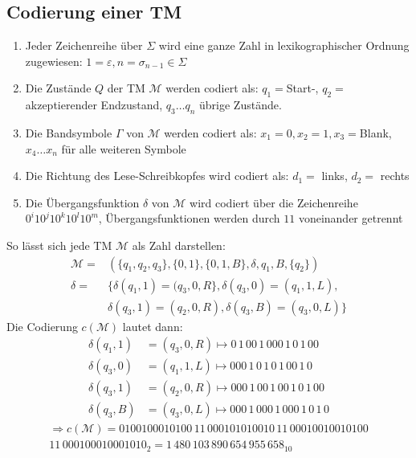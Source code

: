 \subsection{Codierung einer TM}
\begin{enumerate}\itemsep0em
	\item Jeder Zeichenreihe über $\Sigma$ wird eine ganze Zahl in lexikographischer Ordnung zugewiesen:
$1 = \varepsilon, n = \sigma_{n-1} \in \Sigma$
	\item Die Zustände $Q$ der TM $\mathcal{M}$ werden codiert als: $q_1 = $Start-, $q_2 = $akzeptierender Endzustand, $q_3 \dots q_n$ übrige Zustände.
	\item Die Bandsymbole $\Gamma$ von $\mathcal{M}$ werden codiert als: $x_1 = 0, x_2 = 1, x_3 = $Blank, $x_4 \dots x_n$ für alle weiteren Symbole
	\item Die Richtung des Lese-Schreibkopfes wird codiert als: $d_1 = $ links, $d_2 = $ rechts
	\item Die Übergangsfunktion $\delta$ von $\mathcal{M}$ wird codiert über die Zeichenreihe $0^i10^j10^k10^l10^m$, Übergangsfunktionen werden durch $11$ voneinander getrennt
\end{enumerate}
So lässt sich jede TM $\mathcal{M}$ als Zahl darstellen:
\begin{align*}
	\mathcal{M} = &(\{q_1, q_2, q_3\}, \{0,1\}, \{0,1,B\}, \delta, q_1, B, \{q_2\})\\
	\delta = &\{\delta(q_1, 1) = (q_3, 0, R\}, \delta(q_3, 0) = (q_1, 1, L),\\
		& \delta(q_3, 1) = (q_2, 0, R), \delta(q_3, B) = (q_3, 0, L)\}
\end{align*}
Die Codierung $c(\mathcal{M})$ lautet dann:
\begin{align*}
	\delta(q_1, 1)& = (q_3, 0, R) \mapsto 0\,1\,00\,1\,000\,1\,0\,1\,00\\
	\delta(q_3, 0)& = (q_1, 1, L) \mapsto 000\,1\,0\,1\,0\,1\,00\,1\,0\\
	\delta(q_3, 1)& = (q_2, 0, R) \mapsto 000\,1\,00\,1\,00\,1\,0\,1\,00\\
	\delta(q_3, B)& = (q_3, 0, L) \mapsto 000\,1\,000\,1\,000\,1\,0\,1\,0
\end{align*}
\begin{multline*}
\Rightarrow c(\mathcal{M}) = 0100100010100\,11\,000101010010\,11\,00010010010100\\11\,000100010001010_2 = 1\,480\,103\,890\, 654\,955\,658_{10}
\end{multline*}

